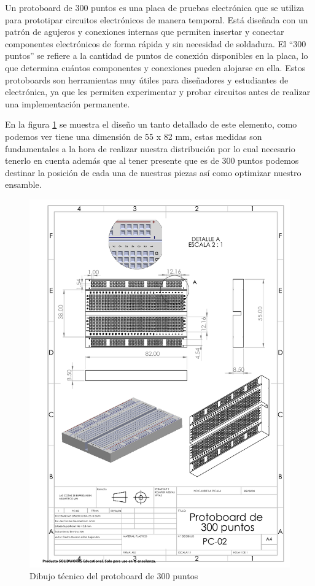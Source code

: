     Un protoboard de 300 puntos es una placa de pruebas electrónica que se utiliza para prototipar circuitos electrónicos de manera temporal. Está diseñada con un patrón de agujeros y conexiones internas que permiten insertar y conectar componentes electrónicos de forma rápida y sin necesidad de soldadura. El “300 puntos” se refiere a la cantidad de puntos de conexión disponibles en la placa, lo que determina cuántos componentes y conexiones pueden alojarse en ella. Estos protoboards son herramientas muy útiles para diseñadores y estudiantes de electrónica, ya que les permiten experimentar y probar circuitos antes de realizar una implementación permanente.
    
    En la figura \ref{fig:proto} se muestra el diseño un tanto detallado de este elemento, como podemos ver tiene una dimensión de 55 x 82 mm, estas medidas son fundamentales a la hora de realizar nuestra distribución por lo cual necesario tenerlo en cuenta además que al tener presente que es de 300 puntos podemos destinar la posición de cada una de nuestras piezas así como optimizar nuestro ensamble.
    
    \begin{figure}[H]
        \centering
        \includegraphics[trim = {7mm 1mm 1mm 1mm},clip,scale=0.4]{22/Img/protoDibujo.pdf}
        \caption{Dibujo técnico del protoboard de 300 puntos}
        \label{fig:proto}
    \end{figure}
    
